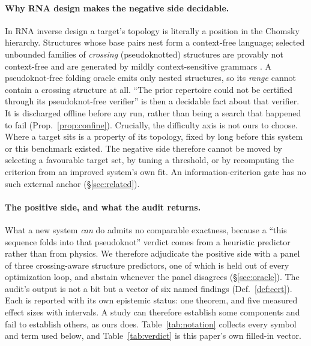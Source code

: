\documentclass[11pt]{article}
\begin{document}
\paragraph{Why RNA design makes the negative side decidable.} In RNA inverse design a target's topology is
literally a position in the Chomsky hierarchy. Structures whose base pairs nest form a context-free language;
selected unbounded families of \emph{crossing} (pseudoknotted) structures are provably not context-free and are
generated by mildly context-sensitive grammars \citep{rivaseddy2000,nebelweinberg,katosekikasami2006}. A
pseudoknot-free folding oracle emits only nested structures, so its \emph{range} cannot contain a crossing
structure at all. ``The prior repertoire could not be certified through its pseudoknot-free verifier'' is then a decidable fact
about that verifier. It is discharged offline before any run, rather than being a search that happened to fail
(Prop.~\ref{prop:confine}). Crucially, the difficulty axis is not ours to choose. Where a target sits is a
property of its topology, fixed by \citet{rivaseddy2000,nebelweinberg,katosekikasami2006} long before this
system or this benchmark existed. The negative side therefore cannot be moved by selecting a favourable target
set, by tuning a threshold, or by recomputing the criterion from an improved system's own fit. An information-criterion
gate has no such external anchor (\S\ref{sec:related}).

\paragraph{The positive side, and what the audit returns.} What a new system \emph{can} do admits no
comparable exactness, because a ``this sequence folds into that pseudoknot'' verdict comes from a heuristic
predictor rather than from physics. We therefore adjudicate the positive side with a panel of three
crossing-aware structure predictors, one of which is held out of every optimization loop, and abstain whenever
the panel disagrees (\S\ref{sec:oracle}). The audit's output is not a bit but a vector of six named findings (Def.~\ref{def:cert}). Each is reported with
its own epistemic status: one theorem, and five measured effect sizes with intervals. A study can therefore
establish some components and fail to establish others, as ours does. Table~\ref{tab:notation} collects every symbol and term used below, and
Table~\ref{tab:verdict} is this paper's own filled-in vector.
\end{document}
